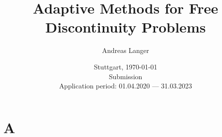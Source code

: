 \documentclass[enabledeprecatedfontcommands,cleardoublepage=empty,headsepline,twoside,11pt,DIV=15,BCOR=12mm,final]{scrartcl}
\begin{document}
%
\begin{titlepage}\sffamily
  \subject{DFG Research Grant Application} 
  \title{Adaptive Methods for Free Discontinuity Problems}%
  
  \author{Andreas Langer}
  \date{Stuttgart, \today \\[50mm] Submission\\[50mm]
    Application period: 01.04.2020 --- 31.03.2023}
\end{titlepage}
%
\maketitle[-1]
\cleardoublepage
\setcounter{page}{1}

\section{A}
\end{document}
